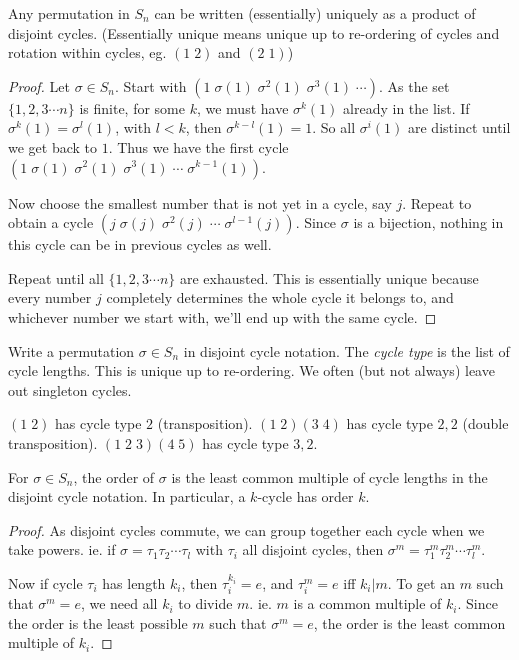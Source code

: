 \documentclass[a4paper]{article}
\begin{document}
\begin{thm}
  Any permutation in $S_n$ can be written (essentially) uniquely as a product of disjoint cycles. (Essentially unique means unique up to re-ordering of cycles and rotation within cycles, eg. $(1\; 2)$ and $(2\; 1)$)
\end{thm}

\begin{proof}
  Let $\sigma\in S_n$. Start with $(1\; \sigma(1)\; \sigma^2(1)\; \sigma^3(1)\;\cdots)$. As the set $\{1, 2, 3\cdots n\}$ is finite, for some $k$, we must have $\sigma^k(1)$ already in the list. If $\sigma^k(1) = \sigma^l(1)$, with $l < k$, then $\sigma^{k-l}(1) = 1$. So all $\sigma^i(1)$ are distinct until we get back to $1$. Thus we have the first cycle $(1\; \sigma(1)\; \sigma^2(1)\; \sigma^3(1)\;\cdots\;\sigma^{k-1}(1))$.

  Now choose the smallest number that is not yet in a cycle, say $j$. Repeat to obtain a cycle $(j\; \sigma(j)\; \sigma^2(j)\;\cdots\; \sigma^{l - 1}(j))$. Since $\sigma$ is a bijection, nothing in this cycle can be in previous cycles as well.

  Repeat until all $\{1, 2, 3\cdots n\}$ are exhausted. This is essentially unique because every number $j$ completely determines the whole cycle it belongs to, and whichever number we start with, we'll end up with the same cycle.
\end{proof}

\begin{defi}
  Write a permutation $\sigma\in S_n$ in disjoint cycle notation. The \emph{cycle type} is the list of cycle lengths. This is unique up to re-ordering. We often (but not always) leave out singleton cycles.
\end{defi}
\begin{eg}
  $(1\; 2)$ has cycle type $2$ (transposition). $(1\; 2)(3\; 4)$ has cycle type $2, 2$ (double transposition). $(1\; 2\; 3)(4\; 5)$ has cycle type $3, 2$.
\end{eg}
\begin{lemma}
  For $\sigma\in S_n$, the order of $\sigma$ is the least common multiple of cycle lengths in the disjoint cycle notation. In particular, a $k$-cycle has order $k$.
\end{lemma}

\begin{proof}
  As disjoint cycles commute, we can group together each cycle when we take powers. ie. if $\sigma = \tau_1\tau_2\cdots\tau_l$ with $\tau_i$ all disjoint cycles, then $\sigma^m = \tau_1^m\tau_2^m\cdots\tau_l^m$.

  Now if cycle $\tau_i$ has length $k_i$, then $\tau_i^{k_i} = e$, and $\tau_i^m = e$ iff $k_i | m$. To get an $m$ such that $\sigma^m = e$, we need all $k_i$ to divide $m$. ie. $m$ is a common multiple of $k_i$. Since the order is the least possible $m$ such that $\sigma^m = e$, the order is the least common multiple of $k_i$.
\end{proof}
\end{document}
